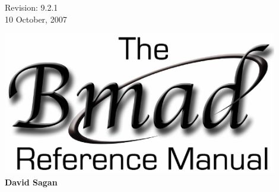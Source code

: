 \thispagestyle{empty}

\begin{flushright}
\large
  Revision: 9.2.1 \\
  10 October, 2007 \\
\end{flushright}

\vfill

{
\begin{center}
\includegraphics[width=12cm]{bmad-ref-manual.eps} \\
\vskip 0.3in
\huge\bf David Sagan
\end{center}
}

\vfill
\break

